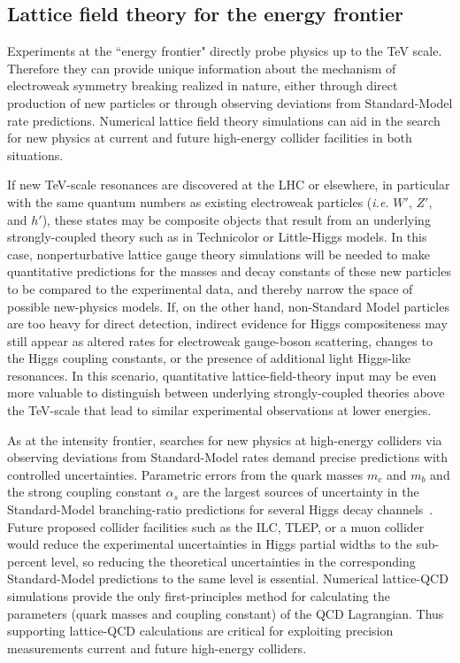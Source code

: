 \subsection{Lattice field theory for the energy frontier}
\label{subsec:lqcd:EF}

Experiments at the ``energy frontier" directly probe physics up to the TeV scale.  Therefore they can provide unique information about the mechanism of electroweak symmetry breaking realized in nature, either through direct production of new particles or through observing deviations from Standard-Model rate predictions.   Numerical lattice field theory simulations can aid in the search for new physics at current and future high-energy collider facilities in both situations.   

If new TeV-scale resonances are discovered at the LHC or elsewhere, in particular with the same quantum numbers as existing electroweak particles ({\it i.e.} $W'$, $Z'$, and $h'$), these states may be composite objects that result from an underlying strongly-coupled theory such as in Technicolor or Little-Higgs models.   In this case, nonperturbative lattice gauge theory simulations will be needed to make quantitative predictions for the masses and decay constants of these new particles to be compared to the experimental data, and thereby narrow the space of possible new-physics models.  If, on the other hand, non-Standard Model particles are too heavy for direct detection, indirect evidence for Higgs compositeness may still appear as altered rates for electroweak gauge-boson scattering, changes to the Higgs coupling constants, or the presence of additional light Higgs-like resonances.  In this scenario, quantitative lattice-field-theory input may be even more valuable to distinguish between underlying strongly-coupled theories above the TeV-scale that lead to similar experimental observations at lower energies.  

As at the intensity frontier, searches for new physics at high-energy colliders via observing deviations from Standard-Model rates demand precise predictions with controlled uncertainties.  Parametric errors from the quark masses $m_c$ and $m_b$ and the strong coupling constant $\alpha_s$ are the largest sources of uncertainty in the Standard-Model branching-ratio predictions for several Higgs decay channels~\cite{Denner:2011mq}.  Future proposed collider facilities such as the ILC, TLEP, or a muon collider would reduce the experimental uncertainties in Higgs partial widths to the sub-percent level, so reducing the theoretical uncertainties in the corresponding Standard-Model predictions to the same level is essential.  Numerical lattice-QCD simulations provide the only first-principles method for calculating the parameters (quark masses and coupling constant) of the QCD Lagrangian.  Thus supporting lattice-QCD calculations are critical for exploiting precision measurements current and future high-energy colliders.

